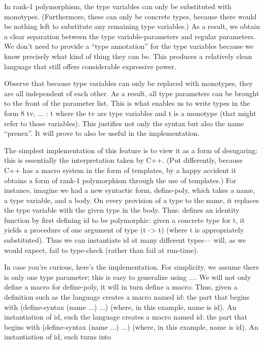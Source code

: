In rank-1 polymorphism, the type variables can only be substituted with
monotypes. (Furthermore, these can only be concrete types, because there would
be nothing left to substitute any remaining type variables.) As a result, we
obtain a clear separation between the type variable-parameters and regular
parameters. We don’t need to provide a “type annotation” for the type variables
because we know precisely what kind of thing they can be. This produces a
relatively clean language that still offers considerable expressive power.

Observe that because type variables can only be replaced with monotypes, they
are all independent of each other. As a result, all type parameters can be
brought to the front of the parameter list. This is what enables us to write
types in the form 8 tv, ... : t where the tv are type variables and t is a
monotype (that might refer to those variables). This justifies not only the
syntax but also the name “prenex”. It will prove to also be useful in the
implementation.


The simplest implementation of this feature is to view it as a form of
desugaring: this is essentially the interpretation taken by C++. (Put
differently, because C++ has a macro system in the form of templates, by a happy
accident it obtains a form of rank-1 polymorphism through the use of templates.)
For instance, imagine we had a new syntactic form, define-poly, which takes a
name, a type variable, and a body. On every provision of a type to the name, it
replaces the type variable with the given type in the body. Thus:
defines an identity function by first defining id to be polymorphic: given a
concrete type for t, it yields a procedure of one argument of type (t -> t)
(where t is appropriately substituted). Thus we can instantiate id at many
different types—
will, as we would expect, fail to type-check (rather than fail at run-time).

In case you’re curious, here’s the implementation. For simplicity, we assume
there is only one type parameter; this is easy to generalize using .... We will
not only define a macro for define-poly, it will in turn define a macro:
Thus, given a definition such as
the language creates a macro named id: the part that begins with (define-syntax
(name ...) ...) (where, in this example, name is id). An instantiation of id,
such the language creates a macro named id: the part that begins with
(define-syntax (name ...) ...) (where, in this example, name is id). An
instantiation of id, such
turns into

